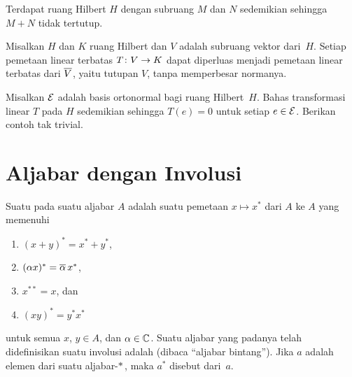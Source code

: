 \begin{exam} Terdapat ruang Hilbert $H$ dengan subruang $M$ dan $N$ sedemikian sehingga $M + N$ tidak tertutup.
\end{exam}

\begin{prop} Misalkan $H$ dan $K$ ruang Hilbert dan $V$ adalah subruang vektor dari~$H$. Setiap pemetaan linear terbatas
$T\colon V \rightarrow K$ dapat diperluas menjadi pemetaan linear terbatas dari $\overline{V}$, yaitu tutupan $V$, tanpa memperbesar normanya.
\end{prop}

\begin{exer} Misalkan $\mathcal{E}$ adalah basis ortonormal bagi ruang Hilbert~$H$. Bahas transformasi linear $T$ pada $H$
sedemikian sehingga $T(e) = 0$ untuk setiap $e \in \mathcal{E}$. Berikan contoh tak trivial.
\end{exer}






















\section{Aljabar dengan Involusi}
\begin{defn}\label{00109}  Suatu
 pada suatu aljabar $A$ adalah suatu pemetaan $x \mapsto x^\ast$ dari $A$ ke $A$ yang memenuhi
  \begin{enumerate}
    \item[(a)] $(x + y)^\ast = x^\ast + y^\ast$,
    \item[(b)] $(\alpha x)^* = \overline{\alpha}\, x^*$,
    \item[(c)] $x^{\ast\ast} = x$, dan
    \item[(d)] $(xy)^\ast = y^\ast x^\ast$
  \end{enumerate}
untuk semua $x$, $y \in A$, dan $\alpha \in \mathbb{C}$.  Suatu aljabar yang padanya telah didefinisikan suatu involusi adalah
 (dibaca ``aljabar bintang''). Jika $a$ adalah elemen dari suatu aljabar-$*\,$, maka $a^*$ disebut
 dari~$a$.
\end{defn}

